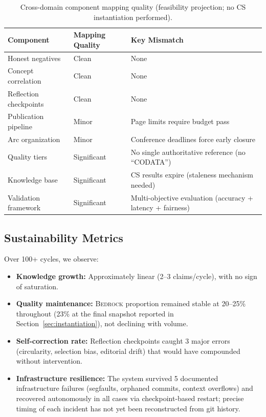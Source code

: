\documentclass[11pt,a4paper]{article}
\newcommand{\bedrock}{\textsc{Bedrock}}
\begin{document}
\begin{table}[t]
\centering
\caption{Cross-domain component mapping quality (feasibility projection; no CS
instantiation performed).}
\label{tab:mapping}
\small
\begin{tabular}{@{}lll@{}}
\toprule
Component & Mapping Quality & Key Mismatch \\
\midrule
Honest negatives       & Clean       & None \\
Concept correlation    & Clean       & None \\
Reflection checkpoints & Clean       & None \\
Publication pipeline   & Minor       & Page limits require budget pass \\
Arc organization       & Minor       & Conference deadlines force early closure \\
Quality tiers          & Significant & No single authoritative reference (no ``CODATA'') \\
Knowledge base         & Significant & CS results expire (staleness mechanism needed) \\
Validation framework   & Significant & Multi-objective evaluation (accuracy + latency + fairness) \\
\bottomrule
\end{tabular}
\end{table}

\subsection{Sustainability Metrics}

Over 100+ cycles, we observe:

\begin{itemize}[nosep]
    \item \textbf{Knowledge growth:} Approximately linear (2--3 claims/cycle),
          with no sign of saturation.
    \item \textbf{Quality maintenance:} \bedrock{} proportion remained stable
          at 20--25\% throughout (23\% at the final snapshot reported in
          Section~\ref{sec:instantiation}), not declining with volume.
    \item \textbf{Self-correction rate:} Reflection checkpoints caught 3 major
          errors (circularity, selection bias, editorial drift) that would have
          compounded without intervention.
    \item \textbf{Infrastructure resilience:} The system survived 5 documented
          infrastructure failures (segfaults, orphaned commits, context overflows)
          and recovered autonomously in all cases via checkpoint-based restart;
          precise timing of each incident has not yet been reconstructed from
          git history.
\end{itemize}
\end{document}
